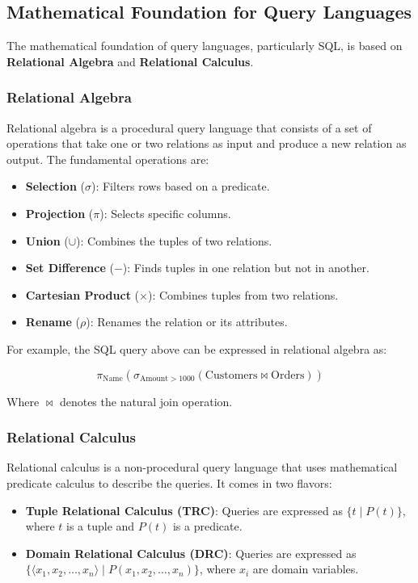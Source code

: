 \documentclass[12pt]{article}
\begin{document}
\subsection*{Mathematical Foundation for Query Languages}

The mathematical foundation of query languages, particularly SQL, is based on \textbf{Relational Algebra} and \textbf{Relational Calculus}.

\subsubsection*{Relational Algebra}

Relational algebra is a procedural query language that consists of a set of operations that take one or two relations as input and produce a new relation as output. The fundamental operations are:

\begin{itemize}
    \item \textbf{Selection} ($\sigma$): Filters rows based on a predicate.
    \item \textbf{Projection} ($\pi$): Selects specific columns.
    \item \textbf{Union} ($\cup$): Combines the tuples of two relations.
    \item \textbf{Set Difference} ($-$): Finds tuples in one relation but not in another.
    \item \textbf{Cartesian Product} ($\times$): Combines tuples from two relations.
    \item \textbf{Rename} ($\rho$): Renames the relation or its attributes.
\end{itemize}

For example, the SQL query above can be expressed in relational algebra as:

\[
\pi_{\text{Name}} \left( \sigma_{\text{Amount} > 1000} \left( \text{Customers} \Join \text{Orders} \right) \right)
\]

Where $\Join$ denotes the natural join operation.

\subsubsection*{Relational Calculus}

Relational calculus is a non-procedural query language that uses mathematical predicate calculus to describe the queries. It comes in two flavors:

\begin{itemize}
    \item \textbf{Tuple Relational Calculus (TRC)}: Queries are expressed as \(\{ t \mid P(t) \}\), where \( t \) is a tuple and \( P(t) \) is a predicate.
    \item \textbf{Domain Relational Calculus (DRC)}: Queries are expressed as \(\{ \langle x_1, x_2, \dots, x_n \rangle \mid P(x_1, x_2, \dots, x_n) \}\), where \( x_i \) are domain variables.
\end{itemize}
\end{document}
